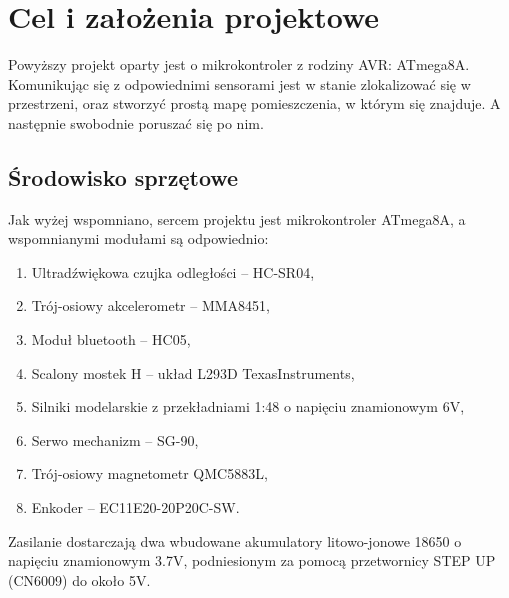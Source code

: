 \section{Cel i założenia projektowe}
    \tab Powyższy projekt oparty jest o mikrokontroler z rodziny AVR: ATmega8A.
    Komunikując się z odpowiednimi sensorami jest w stanie zlokalizować się w przestrzeni,
    oraz stworzyć prostą mapę pomieszczenia, w którym się znajduje. A następnie swobodnie poruszać się po nim.

    \subsection{Środowisko sprzętowe}
        \tab Jak wyżej wspomniano, sercem projektu jest mikrokontroler ATmega8A, a wspomnianymi modułami są odpowiednio:
        \begin{enumerate}
            \item Ultradźwiękowa czujka odległości -- HC-SR04,
            \item Trój-osiowy akcelerometr -- MMA8451,
            \item Moduł bluetooth -- HC05,
            \item Scalony mostek H -- układ L293D TexasInstruments,
            \item Silniki modelarskie z przekładniami 1:48 o napięciu znamionowym 6V,
            \item Serwo mechanizm -- SG-90,
            \item Trój-osiowy magnetometr QMC5883L,
            \item Enkoder -- EC11E20-20P20C-SW.
        \end{enumerate}
% 
        Zasilanie dostarczają dwa wbudowane akumulatory litowo-jonowe 18650 o napięciu znamionowym 3.7V, podniesionym za pomocą przetwornicy STEP UP (CN6009) do około 5V.

